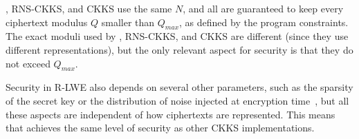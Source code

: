 \name, RNS-CKKS, and CKKS use the same $N$, and all are guaranteed to keep
every ciphertext modulus $Q$ smaller than $Q_{max}$, as defined by the program
constraints.
The exact moduli used by \name, RNS-CKKS, and CKKS are different (since they
use different representations), but the only relevant aspect for security is
that they do not exceed $Q_{max}$.

Security in R-LWE also depends on several other parameters, such as the sparsity
of the secret key or the distribution of noise injected at encryption
time~\cite{albrecht2018estimate}, but all these aspects are independent of how
ciphertexts are represented.
This means that \name achieves the same level of security as other CKKS
implementations.

